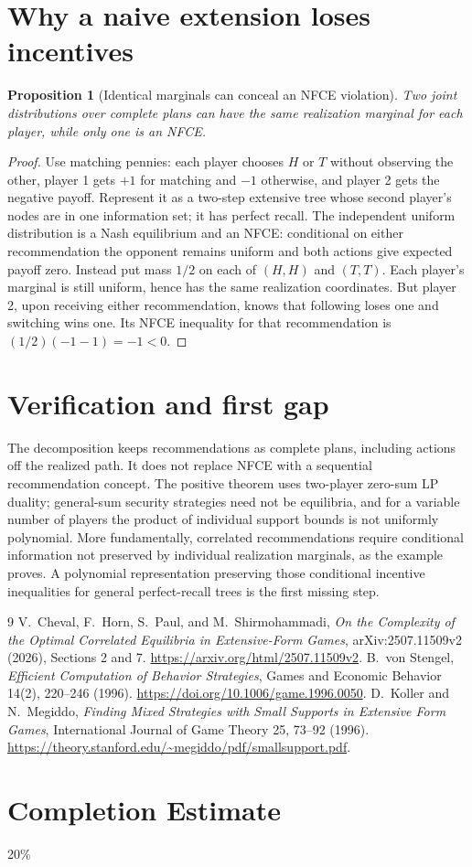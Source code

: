 \documentclass[11pt]{article}
\newtheorem{proposition}[theorem]{Proposition}
\theoremstyle{definition}
\begin{document}
\section{Why a naive extension loses incentives}
\begin{proposition}[Identical marginals can conceal an NFCE violation]
Two joint distributions over complete plans can have the same realization
marginal for each player, while only one is an NFCE.
\end{proposition}
\begin{proof}
Use matching pennies: each player chooses $H$ or $T$ without observing the
other, player 1 gets $+1$ for matching and $-1$ otherwise, and player 2 gets
the negative payoff. Represent it as a two-step extensive tree whose second
player's nodes are in one information set; it has perfect recall.
The independent uniform distribution is a Nash equilibrium and an NFCE:
conditional on either recommendation the opponent remains uniform and both
actions give expected payoff zero. Instead put mass $1/2$ on each of
$(H,H)$ and $(T,T)$. Each player's marginal is still uniform, hence has the
same realization coordinates. But player 2, upon receiving either recommendation,
knows that following loses one and switching wins one. Its NFCE inequality
for that recommendation is $(1/2)(-1-1)=-1<0$.
\end{proof}

\section{Verification and first gap}
The decomposition keeps recommendations as complete plans, including actions
off the realized path. It does not replace NFCE with a sequential recommendation
concept. The positive theorem uses two-player zero-sum LP duality; general-sum
security strategies need not be equilibria, and for a variable number of
players the product of individual support bounds is not uniformly polynomial.
More fundamentally, correlated recommendations require conditional information
not preserved by individual realization marginals, as the example proves.
A polynomial representation preserving those conditional incentive inequalities
for general perfect-recall trees is the first missing step.

\begin{thebibliography}{9}
 V.~Cheval, F.~Horn, S.~Paul, and M.~Shirmohammadi,
\emph{On the Complexity of the Optimal Correlated Equilibria in Extensive-Form
Games}, arXiv:2507.11509v2 (2026), Sections 2 and 7.
\url{https://arxiv.org/html/2507.11509v2}.
 B.~von Stengel, \emph{Efficient Computation of Behavior
Strategies}, Games and Economic Behavior 14(2), 220--246 (1996).
\url{https://doi.org/10.1006/game.1996.0050}.
 D.~Koller and N.~Megiddo, \emph{Finding Mixed Strategies
with Small Supports in Extensive Form Games}, International Journal of Game
Theory 25, 73--92 (1996).
\url{https://theory.stanford.edu/~megiddo/pdf/smallsupport.pdf}.
\end{thebibliography}

\section{Completion Estimate}
20\%
\end{document}

